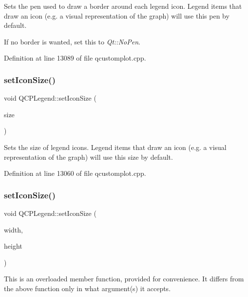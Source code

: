 Sets the pen used to draw a border around each legend icon. Legend items that draw an icon (e.\+g. a visual representation of the graph) will use this pen by default.

If no border is wanted, set this to {\itshape Qt\+::\+No\+Pen}. 

Definition at line 13089 of file qcustomplot.\+cpp.

\mbox{\label{class_q_c_p_legend_a8b0740cce488bf7010da6beda6898984}} 
\subsubsection{\texorpdfstring{set\+Icon\+Size()}{setIconSize()}\hspace{0.1cm}{\footnotesize\ttfamily [1/2]}}
{\footnotesize\ttfamily void Q\+C\+P\+Legend\+::set\+Icon\+Size (\begin{DoxyParamCaption}\item[{const Q\+Size \&}]{size }\end{DoxyParamCaption})}

Sets the size of legend icons. Legend items that draw an icon (e.\+g. a visual representation of the graph) will use this size by default. 

Definition at line 13060 of file qcustomplot.\+cpp.

\mbox{\label{class_q_c_p_legend_a96b1a37fd4ee6a9778e6e54fe56ab6c2}} 
\subsubsection{\texorpdfstring{set\+Icon\+Size()}{setIconSize()}\hspace{0.1cm}{\footnotesize\ttfamily [2/2]}}
{\footnotesize\ttfamily void Q\+C\+P\+Legend\+::set\+Icon\+Size (\begin{DoxyParamCaption}\item[{int}]{width,  }\item[{int}]{height }\end{DoxyParamCaption})}

This is an overloaded member function, provided for convenience. It differs from the above function only in what argument(s) it accepts. 

